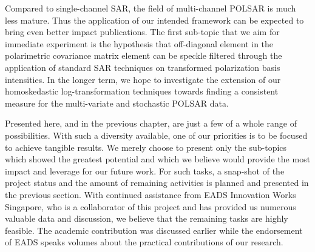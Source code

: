 Compared to single-channel SAR, the field of multi-channel POLSAR is much less mature. 
Thus the application of our intended framework can be expected to bring even better impact publications.
The first sub-topic that we aim for immediate experiment is the hypothesis that off-diagonal element in the polarimetric covariance matrix element can be speckle filtered through the application of standard SAR techniques on transformed polarization basis intensities.
In the longer term, we hope to investigate the extension of our homoskedastic log-transformation techniques towards finding a consistent measure for the multi-variate and stochastic POLSAR data.


Presented here, and in the previous chapter, are just a few of a whole range of possibilities. 
With such a diversity available, one of our priorities is to be focused to achieve tangible results.
We merely choose to present only the sub-topics which showed the greatest potential and which we believe would provide the most impact and leverage for our future work.
For such tasks, a snap-shot of the project status and the amount of remaining activities is planned and presented in the previous section.
With continued assistance from EADS Innovation Works Singapore, who is a collaborator of this project and has provided us numerous valuable data and discussion, we believe that the remaining tasks are highly feasible.
The academic contribution was discussed earlier while the endorsement of EADS speaks volumes about the practical contributions of our research.


